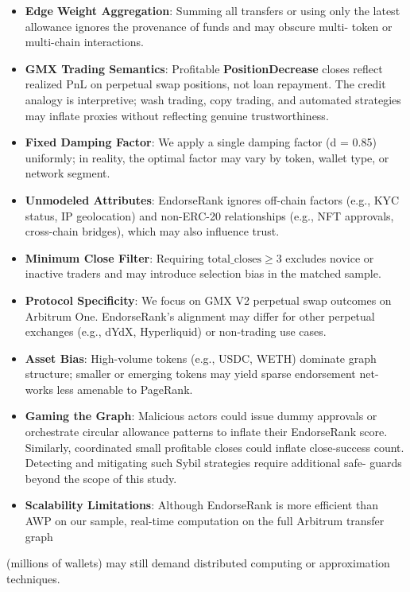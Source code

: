\begin{itemize}
\item[\textbullet] \textbf{Edge Weight Aggregation}: Summing all transfers or using only the latest allowance ignores the provenance of funds and may obscure multi- token or multi-chain interactions.
\item[\textbullet] \textbf{GMX Trading Semantics}: Profitable \textbf{PositionDecrease} closes reflect realized PnL on perpetual swap positions, not loan repayment. The credit analogy is interpretive; wash trading, copy trading, and automated strategies may inflate proxies without reflecting genuine trustworthiness.
\end{itemize}

\begin{itemize}
\item[\textbullet] \textbf{Fixed Damping Factor}: We apply a single damping factor (d = 0.85) uniformly; in reality, the optimal factor may vary by token, wallet type, or network segment.
\item[\textbullet] \textbf{Unmodeled Attributes}: EndorseRank ignores off-chain factors (e.g., KYC status, IP geolocation) and non-ERC-20 relationships (e.g., NFT approvals, cross-chain bridges), which may also influence trust.
\item[\textbullet] \textbf{Minimum Close Filter}: Requiring $\text{total\_closes} \geq 3$ excludes novice or inactive traders and may introduce selection bias in the matched sample.
\end{itemize}

\begin{itemize}
\item[\textbullet] \textbf{Protocol Specificity}: We focus on GMX V2 perpetual swap outcomes on Arbitrum One. EndorseRank's alignment may differ for other perpetual exchanges (e.g., dYdX, Hyperliquid) or non-trading use cases.
\item[\textbullet] \textbf{Asset Bias}: High-volume tokens (e.g., USDC, WETH) dominate graph structure; smaller or emerging tokens may yield sparse endorsement net- works less amenable to PageRank.
\end{itemize}

\begin{itemize}
\item[\textbullet] \textbf{Gaming the Graph}: Malicious actors could issue dummy approvals or orchestrate circular allowance patterns to inflate their EndorseRank score. Similarly, coordinated small profitable closes could inflate close-success count. Detecting and mitigating such Sybil strategies require additional safe- guards beyond the scope of this study.
\end{itemize}

\begin{itemize}
\item[\textbullet] \textbf{Scalability Limitations}: Although EndorseRank is more efficient than AWP on our sample, real-time computation on the full Arbitrum transfer graph
\end{itemize}
(millions of wallets) may still demand distributed computing or approximation techniques.
